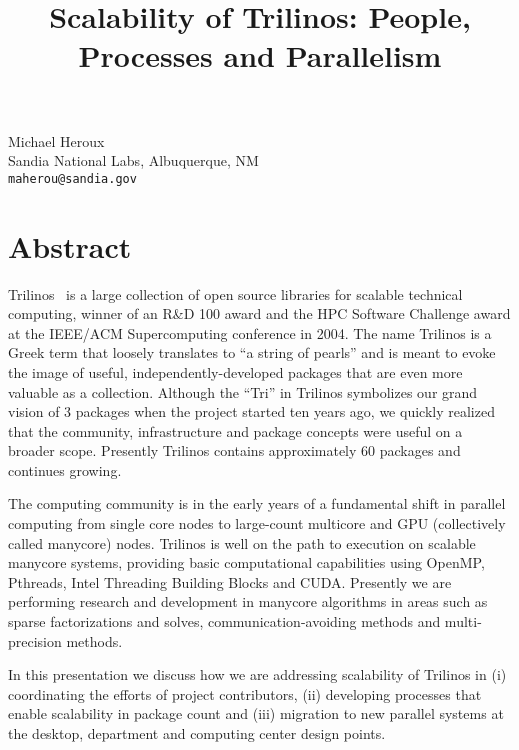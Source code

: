 


\title{Scalability of Trilinos: People, Processes and Parallelism}
\author{} \institute{} %
\maketitle
\begin{center}
{\large Michael Heroux}\\
Sandia National Labs, Albuquerque, NM\\
{\tt maherou@sandia.gov}\\
\end{center}

\section*{Abstract}

Trilinos~\cite{trilinoshomepage,Trilinos-Overview-TOMS} is a large collection of open source libraries for scalable technical computing, winner of an R\&D 100 award and the HPC Software Challenge award at the IEEE/ACM Supercomputing conference in 2004.  The name Trilinos is a Greek term that loosely translates to ``a string of pearls'' and is meant to evoke the image of useful, independently-developed packages that are even more valuable as a collection.  Although the ``Tri'' in Trilinos symbolizes our grand vision of 3 packages when the project started ten years ago, we quickly realized that the community, infrastructure and package concepts were useful on a broader scope.  Presently Trilinos contains approximately 60 packages and continues growing.  

The computing community is in the early years of a fundamental shift in parallel computing from single core nodes to large-count multicore and GPU (collectively called manycore) nodes.  Trilinos is well on the path to execution on scalable manycore systems, providing basic computational capabilities using OpenMP, Pthreads, Intel Threading Building Blocks and CUDA.  Presently we are performing research and development in manycore algorithms in areas such as sparse factorizations and solves, communication-avoiding methods and multi-precision methods.

In this presentation we discuss how we are addressing scalability of Trilinos in (i) coordinating the efforts of project contributors, (ii) developing processes that enable scalability in package count and (iii) migration to new parallel systems at the desktop, department and computing center design points.

